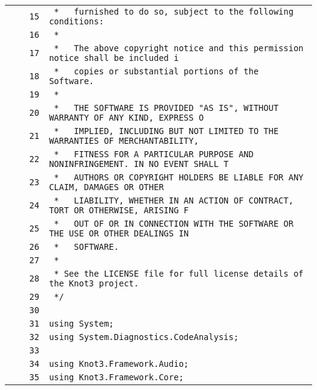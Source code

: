 \documentclass[a4paper,10pt]{article}
\begin{document}
\begin{longtable}[l]{lrrl}
\cellcolor{gray} &  & \verb~15~ & \verb~ *   furnished to do so, subject to the following conditions:~\\
\cellcolor{gray} &  & \verb~16~ & \verb~ *~\\
\cellcolor{gray} &  & \verb~17~ & \verb~ *   The above copyright notice and this permission notice shall be included i~\\
\cellcolor{gray} &  & \verb~18~ & \verb~ *   copies or substantial portions of the Software.~\\
\cellcolor{gray} &  & \verb~19~ & \verb~ *~\\
\cellcolor{gray} &  & \verb~20~ & \verb~ *   THE SOFTWARE IS PROVIDED "AS IS", WITHOUT WARRANTY OF ANY KIND, EXPRESS O~\\
\cellcolor{gray} &  & \verb~21~ & \verb~ *   IMPLIED, INCLUDING BUT NOT LIMITED TO THE WARRANTIES OF MERCHANTABILITY,~\\
\cellcolor{gray} &  & \verb~22~ & \verb~ *   FITNESS FOR A PARTICULAR PURPOSE AND NONINFRINGEMENT. IN NO EVENT SHALL T~\\
\cellcolor{gray} &  & \verb~23~ & \verb~ *   AUTHORS OR COPYRIGHT HOLDERS BE LIABLE FOR ANY CLAIM, DAMAGES OR OTHER~\\
\cellcolor{gray} &  & \verb~24~ & \verb~ *   LIABILITY, WHETHER IN AN ACTION OF CONTRACT, TORT OR OTHERWISE, ARISING F~\\
\cellcolor{gray} &  & \verb~25~ & \verb~ *   OUT OF OR IN CONNECTION WITH THE SOFTWARE OR THE USE OR OTHER DEALINGS IN~\\
\cellcolor{gray} &  & \verb~26~ & \verb~ *   SOFTWARE.~\\
\cellcolor{gray} &  & \verb~27~ & \verb~ *~\\
\cellcolor{gray} &  & \verb~28~ & \verb~ * See the LICENSE file for full license details of the Knot3 project.~\\
\cellcolor{gray} &  & \verb~29~ & \verb~ */~\\
\cellcolor{gray} &  & \verb~30~ & \verb~~\\
\cellcolor{gray} &  & \verb~31~ & \verb~using System;~\\
\cellcolor{gray} &  & \verb~32~ & \verb~using System.Diagnostics.CodeAnalysis;~\\
\cellcolor{gray} &  & \verb~33~ & \verb~~\\
\cellcolor{gray} &  & \verb~34~ & \verb~using Knot3.Framework.Audio;~\\
\cellcolor{gray} &  & \verb~35~ & \verb~using Knot3.Framework.Core;~\\

\end{longtable}
\end{document}
